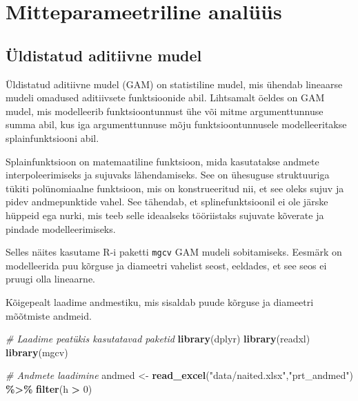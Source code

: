 \documentclass[
]{book}
\newenvironment{Shaded}{\begin{snugshade}}{\end{snugshade}}
\newcommand{\CommentTok}[1]{\textcolor[rgb]{0.56,0.35,0.01}{\textit{#1}}}
\newcommand{\DecValTok}[1]{\textcolor[rgb]{0.00,0.00,0.81}{#1}}
\newcommand{\FunctionTok}[1]{\textcolor[rgb]{0.13,0.29,0.53}{\textbf{#1}}}
\newcommand{\NormalTok}[1]{#1}
\newcommand{\OtherTok}[1]{\textcolor[rgb]{0.56,0.35,0.01}{#1}}
\newcommand{\SpecialCharTok}[1]{\textcolor[rgb]{0.81,0.36,0.00}{\textbf{#1}}}
\newcommand{\StringTok}[1]{\textcolor[rgb]{0.31,0.60,0.02}{#1}}
\renewenvironment{Shaded} {\begin{snugshade}\footnotesize} {\end{snugshade}}
\theoremstyle{definition}
\theoremstyle{definition}
\theoremstyle{definition}
\theoremstyle{definition}
\theoremstyle{remark}
\begin{document}
\chapter{Mitteparameetriline analüüs}\label{mitteparameetriline-analuxfcuxfcs}

\section{Üldistatud aditiivne mudel}\label{uxfcldistatud-aditiivne-mudel}

Üldistatud aditiivne mudel (GAM) on statistiline mudel, mis ühendab lineaarse mudeli omadused aditiivsete funktsioonide abil. Lihtsamalt öeldes on GAM mudel, mis modelleerib funktsioontunnust ühe või mitme argumenttunnuse summa abil, kus iga argumenttunnuse mõju funktsioontunnusele modelleeritakse splainfunktsiooni abil.

Splainfunktsioon on matemaatiline funktsioon, mida kasutatakse andmete interpoleerimiseks ja sujuvaks lähendamiseks. See on ühesuguse struktuuriga tükiti polünomiaalne funktsioon, mis on konstrueeritud nii, et see oleks sujuv ja pidev andmepunktide vahel. See tähendab, et splinefunktsioonil ei ole järske hüppeid ega nurki, mis teeb selle ideaalseks tööriistaks sujuvate kõverate ja pindade modelleerimiseks.

Selles näites kasutame R-i paketti \texttt{mgcv} GAM mudeli sobitamiseks. Eesmärk on modelleerida puu kõrguse ja diameetri vahelist seost, eeldades, et see seos ei pruugi olla lineaarne.

Kõigepealt laadime andmestiku, mis sisaldab puude kõrguse ja diameetri mõõtmiste andmeid.

\begin{Shaded}
\begin{Highlighting}[]
\CommentTok{\# Laadime peatükis kasutatavad paketid}
\FunctionTok{library}\NormalTok{(dplyr)}
\FunctionTok{library}\NormalTok{(readxl)}
\FunctionTok{library}\NormalTok{(mgcv)}
\end{Highlighting}
\end{Shaded}

\begin{Shaded}
\begin{Highlighting}[]
\CommentTok{\# Andmete laadimine}
\NormalTok{andmed }\OtherTok{\textless{}{-}} \FunctionTok{read\_excel}\NormalTok{(}\StringTok{"data/naited.xlsx"}\NormalTok{,}\StringTok{"prt\_andmed"}\NormalTok{) }\SpecialCharTok{\%\textgreater{}\%} \FunctionTok{filter}\NormalTok{(h }\SpecialCharTok{\textgreater{}} \DecValTok{0}\NormalTok{)}
\end{Highlighting}
\end{Shaded}
\end{document}
